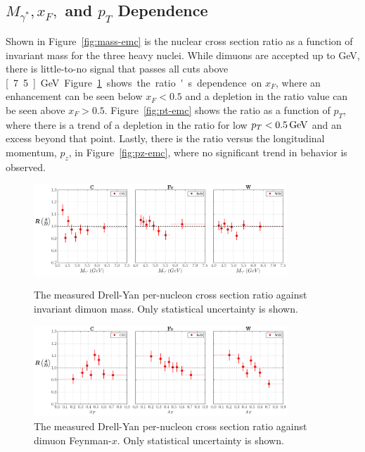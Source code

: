 \subsection{$M_{\gamma^*}, x_F,$ and $p_T$ Dependence}

Shown in Figure~\ref{fig:mass-emc} is the nuclear cross section ratio as a function of invariant mass for the three heavy nuclei. While dimuons are accepted up to \unit[10]{GeV}, there is little-to-no signal that passes all cuts above \unit[7.5]{GeV}. Figure~\ref{fig:xf-emc} shows the ratio's dependence on $x_F$, where an enhancement can be seen below $x_F<0.5$ and a depletion in the ratio value can be seen above $x_F>0.5$. Figure~\ref{fig:pt-emc} shows the ratio as a function of $p_T$, where there is a trend of a depletion in the ratio for low $p_T<\unit[0.5]{GeV}$ and an excess beyond that point. Lastly, there is the ratio versus the longitudinal momentum, $p_z$, in Figure~\ref{fig:pz-emc}, where no significant trend in behavior is observed.

\begin{figure}
	\centering
	\includegraphics[width=0.85\textwidth]{figures/results/mass-emc.png}
	\caption{The measured Drell-Yan per-nucleon cross section ratio against invariant dimuon mass. Only statistical uncertainty is shown.}
	\label{fig:mass-emc}
	\vspace{1cm}
	\includegraphics[width=0.85\textwidth]{figures/results/xF-emc.png}
	\caption{The measured Drell-Yan per-nucleon cross section ratio against dimuon Feynman-$x$. Only statistical uncertainty is shown.}
	\label{fig:xf-emc}
\end{figure}

